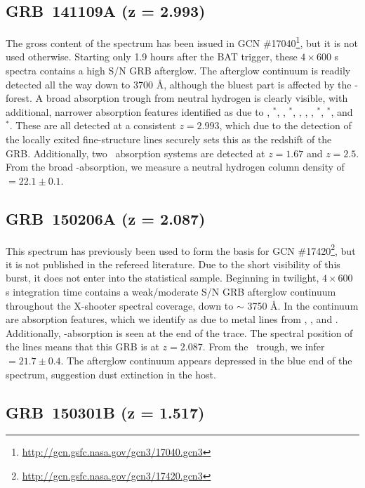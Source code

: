\documentclass{aa}    %
\begin{document}
\subsection{GRB~141109A (z = 2.993)}	

The gross content of the spectrum has been issued in GCN
\#17040\footnote{\url{http://gcn.gsfc.nasa.gov/gcn3/17040.gcn3}}, but it is not
used otherwise. Starting only 1.9 hours after the BAT trigger, these
$4\times600$ s spectra contains a high S/N GRB afterglow. The afterglow
continuum is readily detected all the way down to 3700 \AA, although the bluest
part is affected by the \lya-forest. A broad absorption trough from neutral
hydrogen is clearly visible, with additional, narrower absorption features
identified as due to \SIii, \SIii$^*$, \cii, \cii$^*$, \SIiv, \civ, \feii,
\feii$^*$, \oi$^*$, and \nii$^*$. These are all detected at a consistent $z =
2.993$, which due to the detection of the locally exited fine-structure lines
securely sets this as the redshift of the GRB. Additionally, two
\mgii~absorption systems are detected at $z = 1.67$ and $z=2.5$. From the broad
\lya-absorption, we measure a neutral hydrogen column density of \nh~$=22.1 \pm
0.1$.

\subsection{GRB~150206A (z = 2.087)}	

This spectrum has previously been used to form the basis for GCN
\#17420\footnote{\url{http://gcn.gsfc.nasa.gov/gcn3/17420.gcn3}}, but it is not
published in the refereed literature. Due to the short visibility of this burst,
it does not enter into the statistical sample. Beginning in twilight,
$4\times600$ s integration time contains a weak/moderate S/N GRB afterglow
continuum throughout the X-shooter spectral coverage, down to $\sim$ 3750 \AA.
In the continuum are absorption features, which we identify as due to metal
lines from \znii, \feii, and \mgii. Additionally, \lya-absorption is seen at the
end of the trace. The spectral position of the lines means that this GRB is at
$z = 2.087$. From the \lya~trough, we infer \nh~$=21.7 \pm 0.4$. The afterglow
continuum appears depressed in the blue end of the spectrum, suggestion dust
extinction in the host.

\subsection{GRB~150301B (z = 1.517)}	
\end{document}
